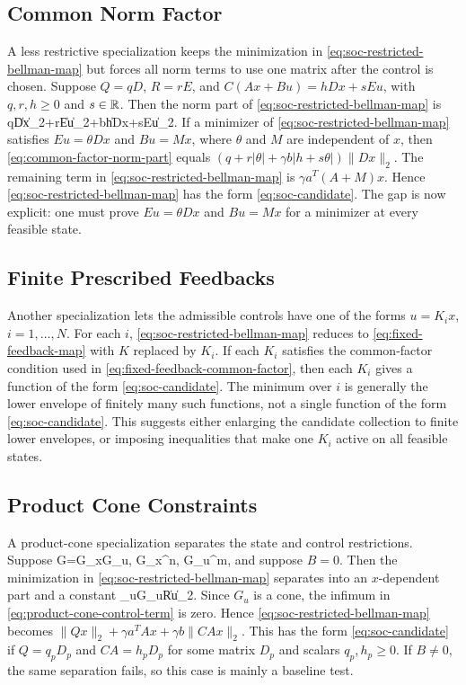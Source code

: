\documentclass{article}
\begin{document}
\subsection{Common Norm Factor}

A less restrictive specialization keeps the minimization in \eqref{eq:soc-restricted-bellman-map} but forces all norm terms to use one matrix after the control is chosen. Suppose $Q=qD$, $R=rE$, and $C(Ax+Bu)=hD x+s Eu$, with $q,r,h\geq0$ and $s\in\mathbb{R}$. Then the norm part of \eqref{eq:soc-restricted-bellman-map} is
\BEQ
q\|Dx\|_2+r\|Eu\|_2+\gamma b\|hDx+sEu\|_2.
\label{eq:common-factor-norm-part}
\EEQ
If a minimizer of \eqref{eq:soc-restricted-bellman-map} satisfies $Eu=\theta Dx$ and $Bu=Mx$, where $\theta$ and $M$ are independent of $x$, then \eqref{eq:common-factor-norm-part} equals $(q+r|\theta|+\gamma b|h+s\theta|)\|Dx\|_2$. The remaining term in \eqref{eq:soc-restricted-bellman-map} is $\gamma a^T(A+M)x$. Hence \eqref{eq:soc-restricted-bellman-map} has the form \eqref{eq:soc-candidate}. The gap is now explicit: one must prove $Eu=\theta Dx$ and $Bu=Mx$ for a minimizer at every feasible state.

\subsection{Finite Prescribed Feedbacks}

Another specialization lets the admissible controls have one of the forms $u=K_i x$, $i=1,\ldots,N$. For each $i$, \eqref{eq:soc-restricted-bellman-map} reduces to \eqref{eq:fixed-feedback-map} with $K$ replaced by $K_i$. If each $K_i$ satisfies the common-factor condition used in \eqref{eq:fixed-feedback-common-factor}, then each $K_i$ gives a function of the form \eqref{eq:soc-candidate}. The minimum over $i$ is generally the lower envelope of finitely many such functions, not a single function of the form \eqref{eq:soc-candidate}. This suggests either enlarging the candidate collection to finite lower envelopes, or imposing inequalities that make one $K_i$ active on all feasible states.


\subsection{Product Cone Constraints}

A product-cone specialization separates the state and control restrictions. Suppose
\BEQ
G=G_x\times G_u,
\quad G_x\subseteq\reals^n,
\quad G_u\subseteq\reals^m,
\label{eq:product-cone-specialization}
\EEQ
and suppose $B=0$. Then the minimization in \eqref{eq:soc-restricted-bellman-map} separates into an $x$-dependent part and a constant
\BEQ
\inf_{u\in G_u}\|Ru\|_2.
\label{eq:product-cone-control-term}
\EEQ
Since $G_u$ is a cone, the infimum in \eqref{eq:product-cone-control-term} is zero. Hence \eqref{eq:soc-restricted-bellman-map} becomes $\|Qx\|_2+\gamma a^TAx+\gamma b\|CAx\|_2$. This has the form \eqref{eq:soc-candidate} if $Q=q_pD_p$ and $CA=h_pD_p$ for some matrix $D_p$ and scalars $q_p,h_p\geq0$. If $B\neq0$, the same separation fails, so this case is mainly a baseline test.
\end{document}
